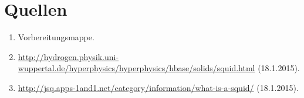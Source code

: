 \documentclass[a4paper,ngerman]{scrartcl}
\begin{document}








\section{Quellen}
\begin{enumerate}
\item Vorbereitungsmappe.\label{ref:mappe}
\item \url{http://hydrogen.physik.uni-wuppertal.de/hyperphysics/hyperphysics/hbase/solids/squid.html} (18.1.2015).\label{ref:wuppertal}
\item \url{http://jsq.apps-1and1.net/category/information/what-is-a-squid/} (18.1.2015).
\label{ref:jsq}
\end{enumerate}
\end{document}
